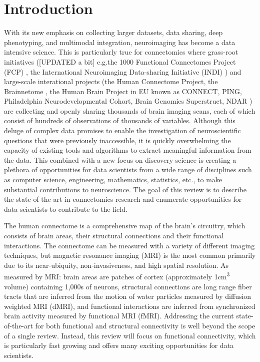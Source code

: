 \section{Introduction}

With its new emphasis on collecting larger datasets, data sharing, deep
phenotyping, and multimodal integration, neuroimaging has become a data
intensive science. This is particularly true for connectomics where grass-root
initiatives ([UPDATED a bit] e.g.the 1000 Functional Connectomes Project (FCP)
\cite{Biswal2010}, the International Neuroimaging Data-sharing Initiative
(INDI) \cite{Mennes2013}) and large-scale interational projects (the Human
Connectome Project\cite{Sotiropoulus2013,VanEssen2012}, the Brainnetome
\cite{Jiang2013}, the Human Brain Project in EU known as
CONNECT\cite{Assaf2013}, PING, Philadelphia Neurodevelopmental Cohort,  Brain Genomics Superstruct, NDAR ) 
are collecting and openly sharing thousands of brain imaging scans, each
of which consist of hundreds of observations of thousands of variables.
Although this deluge of complex data promises to enable the investigation of
neuroscientific questions that were previously inaccessible, it is quickly
overwhelming the capacity of existing tools and algorithms to extract
meaningful information from the data. This combined with a new focus on
discovery science is creating a plethora of opportunities for data scientists
from a wide range of disciplines such as computer science, engineering,
mathematics, statistics, etc., to make substantial contributions to
neuroscience. The goal of this review is to describe the state-of-the-art in
connectomics research and enumerate opportunities for data scientists to
contribute to the field.

The human connectome is a comprehensive map of the brain's circuitry, which
consists of brain areas, their structural connections and their functional
interactions. The connectome can be measured with a variety of different
imaging techniques, but magnetic resonance imaging (MRI) is the most common
primarily due to its near-ubiquity, non-invasiveness, and high spatial
resolution. As measured by MRI: brain areas are patches of cortex
(approximately 1\si{\centi\meter\cubed} volume) containing 1,000s of neurons,
structural connections are long range fiber tracts that are inferred from the
motion of water particles measured by diffusion weighted MRI (dMRI), and
functional interactions are inferred from synchronized brain activity measured
by functional MRI (fMRI). Addressing the current state-of-the-art for both
functional and structural connectivity is well beyond the scope of a single
review. Instead, this review will focus on functional connectivity, which is
particularly fast growing and offers many exciting opportunities for data
scientists.

